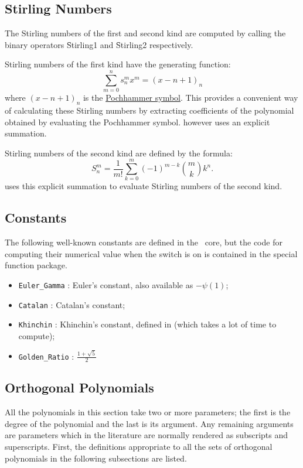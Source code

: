 \subsection{Stirling Numbers}
\hypertarget{STIRL}{}
The Stirling numbers of the first and second kind are computed
by calling the binary operators \f{Stirling1} and \f{Stirling2}
respectively.

Stirling numbers of the first kind have the generating function:
\[\sum_{m=0}^n s_n^m x^m  =  (x-n+1)_n\]
where $(x-n+1)_n$ is the \hyperlink{POCH}{Pochhammer symbol}. This provides
a convenient way of calculating these Stirling numbers by
extracting coefficients of the polynomial obtained by evaluating the
Pochhammer symbol.  \REDUCE however uses an explicit summation.

Stirling numbers of the second kind are defined by the formula:
\[S_n^m = \frac{1}{m!} \sum_{k=0}^m (-1)^{m-k} \binom{m}{k} k^n.\]
\REDUCE uses this explicit summation to evaluate Stirling numbers of the
second kind.

\subsection{Constants}
\hypertarget{CONSTS}{}

The following well-known constants are defined in the \REDUCE\ core,
but the code for computing their numerical value when the switch 
is on is contained in the special function package.
\begin{itemize}
\item \texttt{Euler\_Gamma} : Euler's constant, also available as $-\psi(1)$;
\item \texttt{Catalan} : Catalan's constant;
\item \texttt{Khinchin} : Khinchin's constant, defined in \cite{Khinchin:64}
(which takes a lot of time to compute);
\item \texttt{Golden\_Ratio} : $\displaystyle\frac{1 + \sqrt{5}}{2}$
\end{itemize}


\subsection{Orthogonal Polynomials}
\hypertarget{POLYFN}{}

All the polynomials in this section take two or more parameters; the first is
the degree of the polynomial and the last is its argument. Any remaining
arguments are parameters which in the literature are normally rendered as
subscripts and superscripts. First, the definitions appropriate to all the sets
of orthogonal polynomials in the following subsections are listed.

